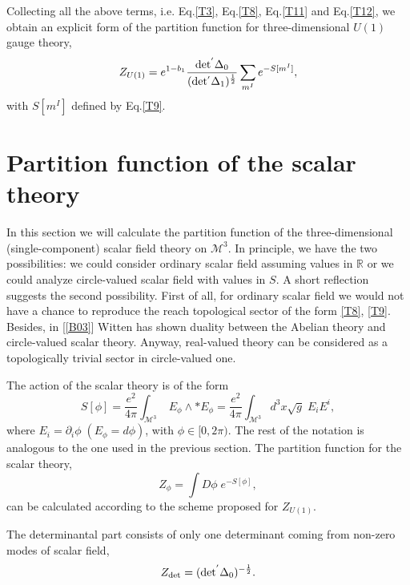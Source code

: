 \documentclass[a4paper,12pt]{article}
\begin{document}
Collecting all the above terms, i.e. Eq.\eqref{T3}, Eq.\eqref{T8}, Eq.\eqref{T11} and Eq.\eqref{T12}, we obtain an
explicit form of the partition function for three-dimensional $U(1)$ gauge theory,
\begin{equation}\label{T13}
Z_{ U(1) }= e^{1 - b_1 } \frac{ \rm det^{'} \Delta_{0} }
{(\rm det^{'}\Delta_{1})^\frac{1}{2} } \sum_{m^ {I} } e^{-S[m^{ I }] },
\end{equation}
with $S[m^{I}]$ defined by Eq.\eqref{T9}.

\section{Partition function of the scalar theory}

In this section we will calculate the partition function of the
three-dimensional (single-component) scalar field theory on
$\mathcal{M}^{3}$. In principle, we have the two possibilities: we
could consider ordinary scalar field assuming values in
$\mathbb{R}$ or we could analyze circle-valued scalar field with values in $S$.
A short reflection suggests the second possibility. First of all, for
ordinary scalar field we would not have a chance to reproduce the
reach topological sector of the form \eqref{T8}, \eqref{T9}. Besides, in [\ref{B03}]
Witten has shown duality between the Abelian theory and circle-valued
scalar theory. Anyway, real-valued theory can be considered as a
topologically trivial sector in circle-valued one.

The action of the scalar theory is of the form
\begin{equation}\label{T14}
S[\phi]= \frac{e^{2}}{4\pi}\int_{\mathcal{M}^{3}}\; E_{\phi}\wedge \ast E_{\phi}
=\frac{e^{2}}{4\pi} \int_{\mathcal{M}^{3}} d^{3}x \sqrt{g}\; E_{i} E^{i},
\end{equation}
where $E_{i}=\partial_{i} \phi \; (E_{\phi}=d \phi)$, with $\phi \in [0,2\pi)$. The
rest of the notation is analogous to the one used in the previous
section. The partition function for the scalar theory,
\begin{equation}\label{T15}
Z_{\phi}=\int D\phi \; e^{-S[\phi]},
\end{equation}
can be calculated according to the scheme proposed for $Z_{U(1)}$.

The determinantal part consists of only one determinant coming from non-zero modes of scalar field,
\begin{equation}\label{T16}
Z_{\rm det}=(\rm det^{'}\Delta_{0})^{-\frac{1}{2}}.
\end{equation}
\end{document}

